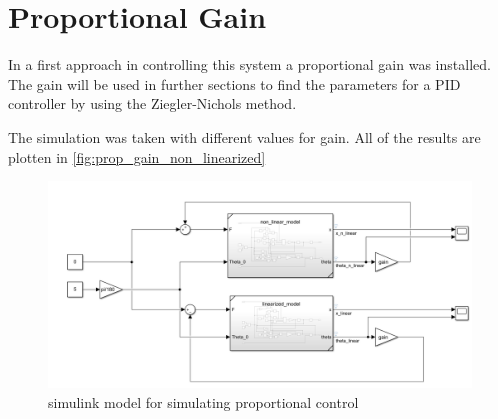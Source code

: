\section{Proportional Gain}
In a first approach in controlling this system a proportional gain was installed. The gain will be used in further sections to find the parameters for a PID controller by using the Ziegler-Nichols method.

The simulation was taken with different values for gain. All of the results are plotten in \autoref{fig:prop_gain_non_linearized}

\begin{figure}[H]
    \centering
    \includegraphics[width=1\textwidth]{Lab_report/pics/modelBuilding/control_sim.PNG}
    \caption{simulink model for simulating proportional control}
    \label{fig:my_label}
\end{figure}
